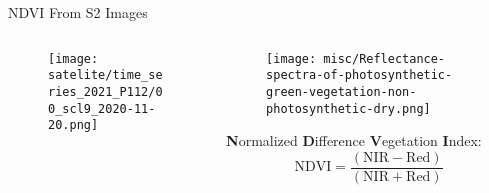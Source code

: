 \begin{frame}{NDVI From S2 Images}

	\begin{columns}
		
	\begin{column}{0.46\textwidth}
		\begin{figure}
			\vspace{-16pt}
			\texttt{[image: satelite/time\_series\_2021\_P112/00\_scl9\_2020-11-20.png]}
		\end{figure}
	\end{column}
		\begin{column}{0.46\textwidth}
			\begin{figure}
				\vspace{-1.6cm}
					\texttt{[image: misc/Reflectance-spectra-of-photosynthetic-green-vegetation-non-photosynthetic-dry.png]}
			\end{figure}
			\medskip
		    \textbf{N}ormalized \textbf{D}ifference \textbf{V}egetation \textbf{I}ndex:
			$$\mathrm{NDVI}=\frac{(\mathrm{NIR}-\mathrm{Red})}{(\mathrm{NIR}+\mathrm{Red})}$$
		\end{column}
		
	\end{columns}
\end{frame}
